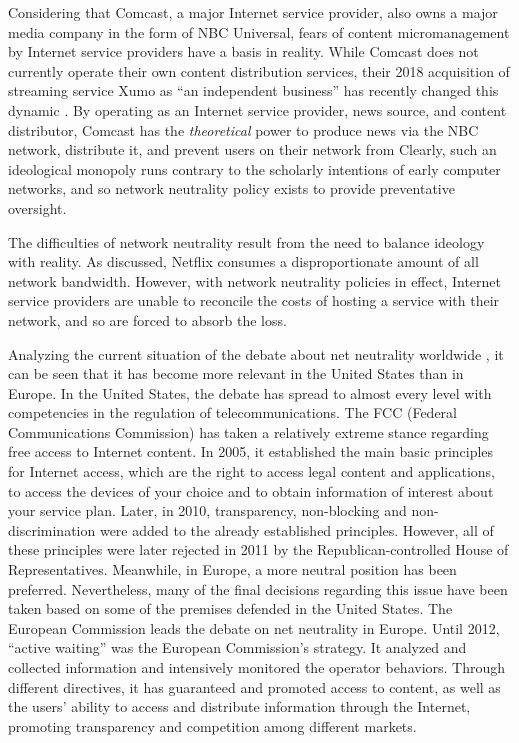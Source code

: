 \documentclass[journal]{IEEEtran}
\begin{document}
Considering that Comcast, a major Internet service provider, also owns a major media company in the form of NBC Universal, fears of content micromanagement by Internet service providers have a basis in reality. While Comcast does not currently operate their own content distribution services, their 2018 acquisition of streaming service Xumo as \enquote{an independent business} has recently changed this dynamic \cite{xumoacquisition}. By operating as an Internet service provider, news source, and content distributor, Comcast has the \emph{theoretical} power to produce news via the NBC network, distribute it, and prevent users on their network from Clearly, such an ideological monopoly runs contrary to the scholarly intentions of early computer networks, and so network neutrality policy exists to provide preventative oversight.

The difficulties of network neutrality result from the need to balance ideology with reality. As discussed, Netflix consumes a disproportionate amount of all network bandwidth. However, with network neutrality policies in effect, Internet service providers are unable to reconcile the costs of hosting a service with their network, and so are forced to absorb the loss.

Analyzing the current situation of the debate about net neutrality worldwide \cite{COIT}, it can be seen that it has become more relevant in the United States than in Europe. In the United States, the debate has spread to almost every level with competencies in the regulation of telecommunications. The FCC (Federal Communications Commission) has taken a relatively extreme stance regarding free access to Internet content. In 2005, it established the main basic principles for Internet access, which are the right to access legal content and applications, to access the devices of your choice and to obtain information of interest about your service plan. Later, in 2010, transparency, non-blocking and non-discrimination were added to the already established principles. However, all of these principles were later rejected in 2011 by the Republican-controlled House of Representatives. Meanwhile, in Europe, a more neutral position has been preferred. Nevertheless, many of the final decisions regarding this issue have been taken based on some of the premises defended in the United States. The European Commission leads the debate on net neutrality in Europe. Until 2012, \enquote{active waiting} was the European Commission’s strategy. It analyzed and collected information and intensively monitored the operator behaviors. Through different directives, it has guaranteed and promoted access to content, as well as the users’ ability to access and distribute information through the Internet, promoting transparency and competition among different markets.
\end{document}
